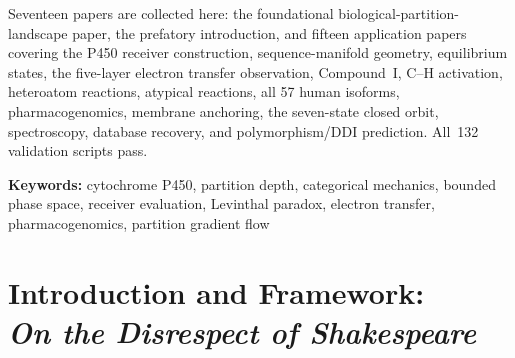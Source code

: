 \documentclass[11pt,a4paper,openany,twoside]{book}
\theoremstyle{definition}
\theoremstyle{remark}
\begin{document}
\medskip
\noindent Seventeen papers are collected here: the foundational
biological-partition-landscape paper, the prefatory introduction, and fifteen
application papers covering the P450 receiver construction, sequence-manifold
geometry, equilibrium states, the five-layer electron transfer observation,
Compound~I, C--H activation, heteroatom reactions, atypical reactions, all 57
human isoforms, pharmacogenomics, membrane anchoring, the seven-state closed
orbit, spectroscopy, database recovery, and polymorphism/DDI prediction.
All~132 validation scripts pass.

\medskip
\noindent\textbf{Keywords:} cytochrome P450, partition depth, categorical
mechanics, bounded phase space, receiver evaluation, Levinthal paradox,
electron transfer, pharmacogenomics, partition gradient flow

\cleardoublepage

\tableofcontents
\cleardoublepage

\listoffigures
{}
\cleardoublepage

\listoftables
{}
\cleardoublepage

\mainmatter
\pagestyle{fancy}


\chapter[Introduction and Framework]{Introduction and Framework:\\
\large\normalfont\itshape On the Disrespect of Shakespeare}
\label{ch:intro}
\end{document}
